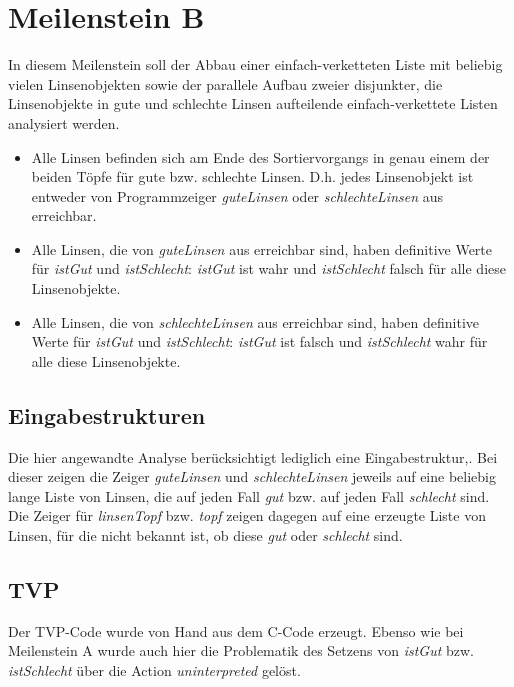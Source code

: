 \section{Meilenstein B}
In diesem Meilenstein soll der Abbau einer einfach-verketteten Liste mit beliebig vielen Linsenobjekten sowie der parallele Aufbau zweier disjunkter, die Linsenobjekte in gute und schlechte Linsen aufteilende einfach-verkettete Listen analysiert werden.
\begin{itemize}
	\item Alle Linsen befinden sich am Ende des Sortiervorgangs in genau einem der beiden Töpfe für gute bzw. schlechte Linsen. D.h. jedes Linsenobjekt ist entweder von Programmzeiger \emph{guteLinsen} oder \emph{schlechteLinsen} aus erreichbar.
	\item Alle Linsen, die von \emph{guteLinsen} aus erreichbar sind, haben definitive Werte für \emph{istGut} und \emph{istSchlecht}: \emph{istGut} ist wahr und \emph{istSchlecht} falsch für alle diese Linsenobjekte.
	\item Alle Linsen, die von \emph{schlechteLinsen} aus erreichbar sind, haben definitive Werte für \emph{istGut} und \emph{istSchlecht}: \emph{istGut} ist falsch und \emph{istSchlecht} wahr für alle diese Linsenobjekte.
\end{itemize}


\subsection{Eingabestrukturen}
Die hier angewandte Analyse berücksichtigt lediglich eine Eingabestruktur,.
Bei dieser zeigen die Zeiger \emph{guteLinsen} und \emph{schlechteLinsen} jeweils auf eine beliebig lange Liste von Linsen, die auf jeden Fall \emph{gut} bzw. auf jeden Fall \emph{schlecht} sind.
Die Zeiger für \emph{linsenTopf} bzw. \emph{topf} zeigen dagegen auf eine erzeugte Liste von Linsen, für die nicht bekannt ist, ob diese \emph{gut} oder \emph{schlecht} sind.

\subsection{TVP}
Der TVP-Code wurde von Hand aus dem C-Code erzeugt.
Ebenso wie bei Meilenstein A wurde auch hier die Problematik des Setzens von \emph{istGut} bzw. \emph{istSchlecht} über die Action \emph{uninterpreted} gelöst.


